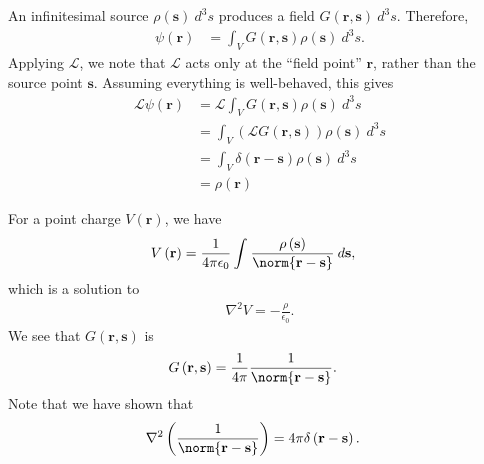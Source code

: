 \documentclass[10pt]{mypackage}
\begin{document}
  An infinitesimal source $\rho\left( \mathbf{s} \right)\:d^3s$ produces a field $G\left( \mathbf{r},\mathbf{s} \right)\:d^3s$. Therefore,
  \begin{align*}
    \psi\left( \mathbf{r} \right) &= \int_{V}^{} G\left( \mathbf{r},\mathbf{s} \right)\rho\left( \mathbf{s} \right)\:d^3s.
  \end{align*}
  Applying $\mathcal{L}$, we note that $\mathcal{L}$ acts only at the ``field point'' $\mathbf{r}$, rather than the source point $\mathbf{s}$. Assuming everything is well-behaved, this gives
  \begin{align*}
    \mathcal{L}\psi\left( \mathbf{r} \right) &= \mathcal{L} \int_{V}^{} G\left( \mathbf{r},\mathbf{s} \right)\rho\left( \mathbf{s} \right)\:d^3s\\
                                             &= \int_{V}^{} \left( \mathcal{L}G\left( \mathbf{r},\mathbf{s} \right) \right)\rho\left( \mathbf{s} \right)\:d^3 s\\
                                             &= \int_{V}^{} \delta\left( \mathbf{r}-\mathbf{s} \right)\rho\left( \mathbf{s} \right)\:d^3s\\
                                             &= \rho\left( \mathbf{r} \right)
  \end{align*}
  \begin{example}
    For a point charge $V\left( \mathbf{r} \right)$, we have
    \begin{align*}
      V\left( \mathbf{r} \right) &= \frac{1}{4\pi \epsilon_0} \int_{}^{} \frac{\rho\left( \mathbf{s} \right)}{\norm{\mathbf{r}-\mathbf{s}}}\:d\mathbf{s},
    \end{align*}
    which is a solution to
    \begin{align*}
      \nabla^2 V = -\frac{\rho}{\epsilon_0}.
    \end{align*}
    We see that $G\left( \mathbf{r},\mathbf{s} \right)$ is
    \begin{align*}
      G\left( \mathbf{r},\mathbf{s} \right) &= \frac{1}{4\pi} \frac{1}{\norm{\mathbf{r}-\mathbf{s}}}.
    \end{align*}
    Note that we have shown that
    \begin{align*}
      \nabla^2 \left( \frac{1}{\norm{\mathbf{r}-\mathbf{s}}} \right) &= 4\pi\delta\left( \mathbf{r}-\mathbf{s} \right).
    \end{align*}
  \end{example}
\end{document}
